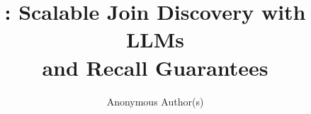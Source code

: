 \documentclass[sigconf, anonymous, screen, pdfa]{acmart}
\begin{document}
\title[\ourmethod: Scalable Join Discovery with LLMs and Recall Guarantees]{\ourmethod: Scalable Join Discovery with LLMs\\ and Recall Guarantees}


\author{Anonymous Author(s)}
\affiliation{\institution{}\country{}}




\maketitle







\balance


\end{document}
